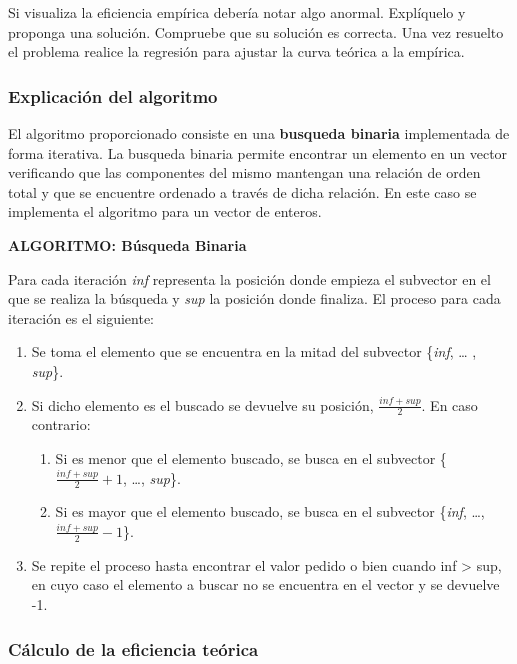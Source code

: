 \documentclass[]{article}
\begin{document}
Si visualiza la eficiencia empírica debería notar algo anormal.
Explíquelo y proponga una solución. Compruebe que su solución es
correcta. Una vez resuelto el problema realice la regresión para ajustar
la curva teórica a la empírica.

\subsubsection{Explicación del
algoritmo}\label{explicacion-del-algoritmo}

El algoritmo proporcionado consiste en una \textbf{busqueda binaria}
implementada de forma iterativa. La busqueda binaria permite encontrar
un elemento en un vector verificando que las componentes del mismo
mantengan una relación de orden total y que se encuentre ordenado a
través de dicha relación. En este caso se implementa el algoritmo para
un vector de enteros.

\textbf{ALGORITMO: Búsqueda Binaria}

Para cada iteración \emph{inf} representa la posición donde empieza el
subvector en el que se realiza la búsqueda y \emph{sup} la posición
donde finaliza. El proceso para cada iteración es el siguiente:

\begin{enumerate}
\def\labelenumi{\arabic{enumi}.}
\itemsep1pt\parskip0pt
\item
  Se toma el elemento que se encuentra en la mitad del subvector
  \{\emph{inf}, \ldots{} , \emph{sup}\}.
\item
  Si dicho elemento es el buscado se devuelve su posición,
  \(\frac{inf+sup}{2}\). En caso contrario:

  \begin{enumerate}
  \def\labelenumii{\alph{enumii})}
  \itemsep1pt\parskip0pt
  \item
    Si es menor que el elemento buscado, se busca en el subvector
    \{\(\frac{inf+sup}{2}+1\), \ldots{}, \emph{sup}\}.
  \item
    Si es mayor que el elemento buscado, se busca en el subvector
    \{\emph{inf}, \ldots{}, \(\frac{inf+sup}{2}-1\)\}.
  \end{enumerate}
\item
  Se repite el proceso hasta encontrar el valor pedido o bien cuando inf
  \textgreater{} sup, en cuyo caso el elemento a buscar no se encuentra
  en el vector y se devuelve -1.
\end{enumerate}

\subsubsection{Cálculo de la eficiencia
teórica}\label{calculo-de-la-eficiencia-teorica-1}
\end{document}
